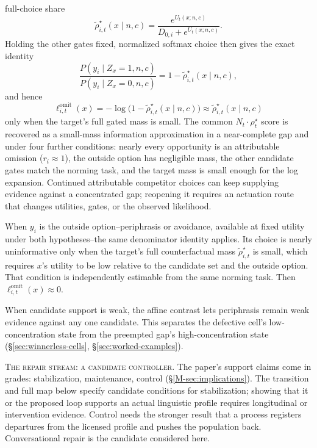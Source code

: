 full-choice share
\[
\widetilde{\rho}_{i,t}^\star(x\mid n,c)=
  \frac{e^{U_t(x;n,c)}}{D_{0,i}+e^{U_t(x;n,c)}}.
\]
Holding the other gates fixed, normalized softmax choice then gives the exact
identity
\[
\frac{P(y_i\mid Z_x=1,n,c)}{P(y_i\mid Z_x=0,n,c)}
  =1-\widetilde{\rho}_{i,t}^\star(x\mid n,c),
\]
and hence
\[
\ell^{\mathrm{omit}}_{i,t}(x)
=-\log\!\bigl(1-\widetilde{\rho}_{i,t}^\star(x\mid n,c)\bigr)
  \approx \widetilde{\rho}_{i,t}^\star(x\mid n,c)
\]
only when the target's full gated mass is small. The common
$N_t\cdot\rho_t^\star$ score is recovered as a small-mass information
approximation in a near-complete gap and
under four further conditions: nearly every opportunity is an attributable
omission ($r_i\approx1$), the outside option has negligible mass, the other
candidate gates match the norming task, and the target mass is small enough for
the log expansion. Continued attributable competitor choices can keep
supplying evidence against a concentrated gap; reopening it requires an
actuation route that changes utilities, gates, or the observed likelihood.

When $y_i$ is the outside option--periphrasis or avoidance, available at fixed
utility under both hypotheses--the same denominator identity applies. Its
choice is nearly uninformative only when the target's full counterfactual mass
$\widetilde{\rho}_{i,t}^\star$ is small, which requires $x$'s utility to be low
relative to the candidate set and the outside option. That condition is
independently estimable from the same norming task. Then
$\ell^{\mathrm{omit}}_{i,t}(x)\approx0$.

When candidate support is weak, the affine contrast lets periphrasis remain
weak evidence against any one candidate. This separates the defective cell's
low-concentration state from the preempted gap's high-concentration state
(\S\ref{sec:winnerless-cells},
\S\ref{sec:worked-examples}).

\noindent\textsc{The repair stream: a candidate controller.}
\label{sec:repair-controller}
The paper's support claims come in grades: stabilization, maintenance, control
(\S\ref{M-sec:implications}). The transition and full map below specify
candidate conditions for stabilization; showing that it or the proposed loop
supports an actual linguistic profile requires longitudinal or intervention
evidence. Control needs the stronger result that a process registers departures
from the licensed profile and pushes the population back. Conversational repair
is the candidate considered here.

